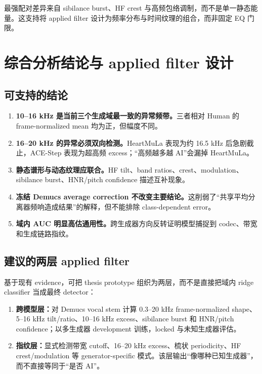 \documentclass[UTF8,11pt,a4paper,fontset=none]{ctexart}
\begin{document}
最强配对差异来自 sibilance burst、HF crest 与高频包络调制，而不是单一静态能量。这支持将 applied filter 设计为频率分布与时间纹理的组合，而非固定 EQ 门限。

\section{综合分析结论与 applied filter 设计}
\label{sec:conclusion}

\subsection{可支持的结论}

\begin{enumerate}
  \item \textbf{10--16 kHz 是当前三个生成域最一致的异常频带。}三者相对 Human 的 frame-normalized mean 均为正，但幅度不同。
  \item \textbf{16--20 kHz 的异常必须双向检测。}HeartMuLa 表现为约 16.5 kHz 后急剧截止，ACE-Step 表现为超高频 excess；“高频越多越 AI”会漏掉 HeartMuLa。
  \item \textbf{静态谱形与动态纹理应联合。}HF tilt、band ratios、crest、modulation、sibilance burst、HNR/pitch confidence 描述互补现象。
  \item \textbf{冻结 Demucs average correction 不改变主要结论。}这削弱了“共享平均分离器频响造成结果”的解释，但不能排除 class-dependent error。
  \item \textbf{域内 AUC 明显高估通用性。}跨生成器方向反转证明模型捕捉到 codec、带宽和生成链路指纹。
\end{enumerate}

\subsection{建议的两层 applied filter}

基于现有 evidence，可把 thesis prototype 组织为两层，而不是直接把域内 ridge classifier 当成最终 detector：

\begin{enumerate}
  \item \textbf{跨模型层：}对 Demucs vocal stem 计算 0.3--20 kHz frame-normalized shape、5--16 kHz tilt/ratio、10--16 kHz excess、sibilance burst 和 HNR/pitch confidence；以多生成器 development 训练，locked 与未知生成器评估。
  \item \textbf{指纹层：}显式检测带宽 cutoff、16--20 kHz excess、梳状 periodicity、HF crest/modulation 等 generator-specific 模式。该层输出“像哪种已知生成器”，而不直接等同于“是否 AI”。
\end{enumerate}
\end{document}
